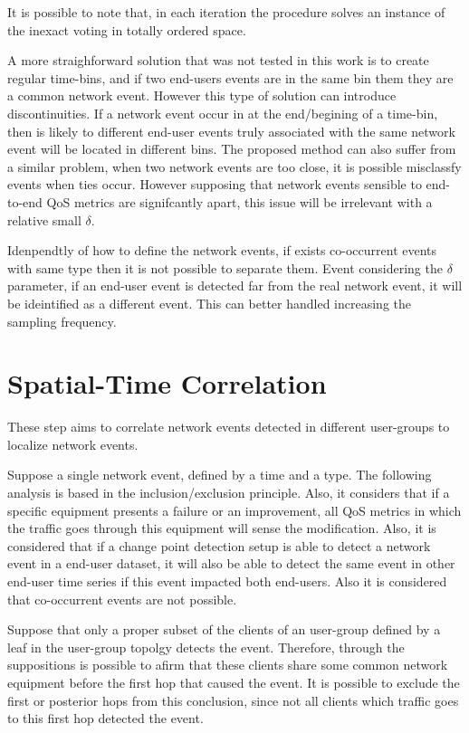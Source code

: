 It is possible to note that, in each iteration the procedure solves an instance
of the inexact voting in totally ordered space.

A more straighforward solution that was not tested in this work is to create
regular time-bins, and if two end-users events are in the same bin them they
are a common network event. However this type of solution can introduce
discontinuities. If a network event occur in at the end/begining of a time-bin,
then is likely to different end-user events truly associated with the same
network event will be located in different bins. The proposed method can also
suffer from a similar problem, when two network events are too close, it is
possible misclassfy events when ties occur.
However supposing
that network events sensible to end-to-end QoS metrics are signifcantly apart,
this issue will be irrelevant with a relative small $\delta$.

Idenpendtly of how to define the network events, if exists co-occurrent events
with same type then it is not possible to separate them. Event considering the
$\delta$ parameter, if an end-user event is detected far from the real network
event, it will be ideintified as a different event. This can better handled
increasing the sampling frequency.

\section{Spatial-Time Correlation}
\label{sec:spatial_time_correlation}

These step aims to correlate network events detected in different user-groups
to localize network events.

Suppose a single network event, defined by a time and a type. The following
analysis is based in the inclusion/exclusion principle. Also, it considers that
if a specific equipment presents a failure or an improvement, all QoS metrics
in which the traffic goes through this equipment will sense the modification.
Also, it is considered that if a change point detection setup is able to
detect a network event in a end-user dataset, it will also be able to detect
the same event in other end-user time series if this event impacted both
end-users. Also it is considered that co-occurrent events are not possible.

Suppose that only a proper subset of the clients of an user-group defined by a
leaf in the user-group topolgy detects the event. Therefore, through the
suppositions is possible to afirm that these clients share some common network
equipment before the first hop that caused the event. It is possible to exclude
the first or posterior hops from this conclusion, since not all clients which
traffic goes to this first hop detected the event.

